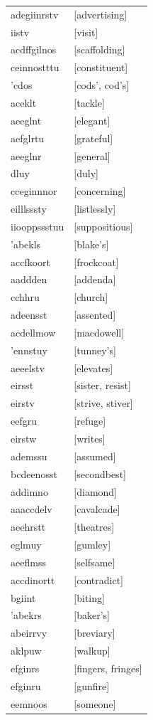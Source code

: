 \documentclass{article}
\begin{document}
\begin{tabular}{ll}
adegiinrstv & [advertising] \\
iistv & [visit] \\
acdffgilnos & [scaffolding] \\
ceinnostttu & [constituent] \\
'cdos & [cods', cod's] \\
aceklt & [tackle] \\
aeeglnt & [elegant] \\
aefglrtu & [grateful] \\
aeeglnr & [general] \\
dluy & [duly] \\
cceginnnor & [concerning] \\
eilllsssty & [listlessly] \\
iiooppssstuu & [suppositious] \\
'abekls & [blake's] \\
accfkoort & [frockcoat] \\
aaddden & [addenda] \\
cchhru & [church] \\
adeensst & [assented] \\
acdellmow & [macdowell] \\
'ennstuy & [tunney's] \\
aeeelstv & [elevates] \\
eirsst & [sister, resist] \\
eirstv & [strive, stiver] \\
eefgru & [refuge] \\
eirstw & [writes] \\
ademssu & [assumed] \\
bcdeenosst & [secondbest] \\
addimno & [diamond] \\
aaaccdelv & [cavalcade] \\
aeehrstt & [theatres] \\
eglmuy & [gumley] \\
aeeflmss & [selfsame] \\
accdinortt & [contradict] \\
bgiint & [biting] \\
'abekrs & [baker's] \\
abeirrvy & [breviary] \\
aklpuw & [walkup] \\
efginrs & [fingers, fringes] \\
efginru & [gunfire] \\
eemnoos & [someone] \\

\end{tabular}
\end{document}
